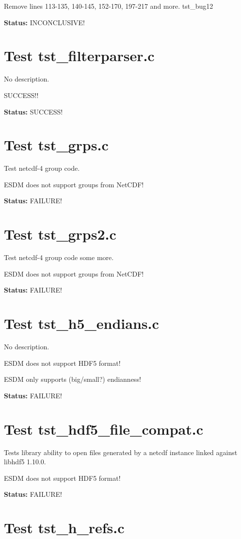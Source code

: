 Remove lines 113-135, 140-145, 152-170, 197-217 and more. tst\_bug12

{\bf \large Status: } INCONCLUSIVE!

\section{Test tst\_filterparser.c}

No description.

SUCCESS!!

{\bf \large Status: } SUCCESS!

\section{Test tst\_grps.c}

Test netcdf-4 group code.

ESDM does not support groups from NetCDF!

{\bf \large Status: } FAILURE!

\section{Test tst\_grps2.c}

Test netcdf-4 group code some more.

ESDM does not support groups from NetCDF!

{\bf \large Status: } FAILURE!

\section{Test tst\_h5\_endians.c}

No description.

ESDM does not support HDF5 format!

ESDM only supports (big/small?) endianness!

{\bf \large Status: } FAILURE!

\section{Test tst\_hdf5\_file\_compat.c}

Tests library ability to open files generated by a netcdf instance linked against libhdf5 1.10.0.

ESDM does not support HDF5 format!

{\bf \large Status: } FAILURE!

\section{Test tst\_h\_refs.c}

